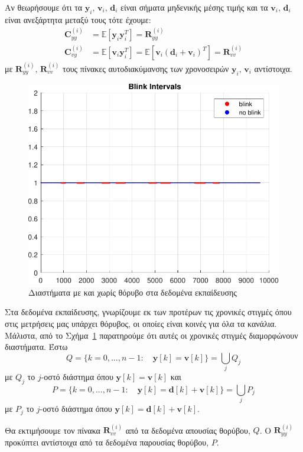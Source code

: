 \documentclass[a4paper,12pt]{article}
\begin{document}
Αν θεωρήσουμε ότι τα $\mathbf{y}_i, \, \mathbf{v}_i, \, \mathbf{d}_i$ είναι σήματα μηδενικής μέσης τιμής
και τα $\mathbf{v}_i, \, \mathbf{d}_i$ είναι ανεξάρτητα μεταξύ τους τότε έχουμε:
\[
\begin{aligned}
    \mathbf{C}_{yy}^{(i)} &= \mathbb{E}[\mathbf{y}_i\mathbf{y}_i^T] = \mathbf{R}_{yy}^{(i)} \\
    \mathbf{C}_{vy}^{(i)} &= \mathbb{E}[\mathbf{v}_i\mathbf{y}_i^T] = 
    \mathbb{E}[\mathbf{v}_i(\mathbf{d}_i + \mathbf{v}_i)^T] = \mathbf{R}_{vv}^{(i)}
\end{aligned}
\]
με $\mathbf{R}_{yy}^{(i)}, \, \mathbf{R}_{vv}^{(i)}$ τους πίνακες αυτοδιακύμανσης των χρονοσειρών
$\mathbf{y}_i, \, \mathbf{v}_i$ αντίστοιχα.

\begin{figure}
    \centering
    \includegraphics[width=0.5\linewidth]{plot/clean_and_noisy_intervals.pdf}
    \caption{Διαστήματα με και χωρίς θόρυβο στα δεδομένα εκπαίδευσης}
    \label{fig:clean_and_noisy_intervals}
\end{figure}

Στα δεδομένα εκπαίδευσης, γνωρίζουμε εκ των προτέρων τις χρονικές στιγμές όπου στις μετρήσεις μας υπάρχει
θόρυβος, οι οποίες είναι κοινές για όλα τα κανάλια. Μάλιστα, από το Σχήμα~\ref{fig:clean_and_noisy_intervals}
παρατηρούμε ότι αυτές οι χρονικές στιγμές διαμορφώνουν διαστήματα. Έστω 
\[
Q = \{k = 0,...,n-1:\quad \mathbf{y}[k] = \mathbf{v}[k]\} = \underset{j}{{\bigcup}} Q_j
\]
με $Q_j$ το $j$-οστό διάστημα όπου $\mathbf{y}[k] = \mathbf{v}[k]$ και
\[
P = \{k = 0,...,n-1:\quad \mathbf{y}[k] = \mathbf{d}[k] + \mathbf{v}[k]\} = \underset{j}{{\bigcup}} P_j
\]
με $P_j$ το $j$-οστό διάστημα όπου $\mathbf{y}[k] = \mathbf{d}[k] + \mathbf{v}[k]$. 

Θα εκτιμήσουμε τον πίνακα $\mathbf{R}_{vv}^{(i)}$ από τα δεδομένα απουσίας θορύβου, $Q$. 
Ο $\mathbf{R}_{yy}^{(i)}$ προκύπτει αντίστοιχα από τα δεδομένα παρουσίας θορύβου, $P$.
\end{document}
